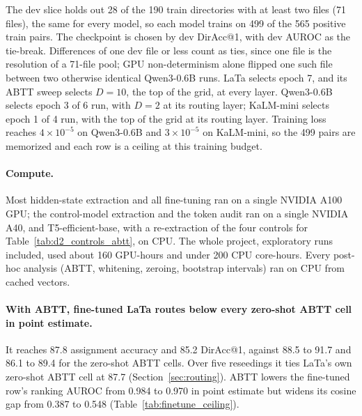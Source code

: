 \documentclass[11pt]{article}
\begin{document}
The dev slice holds out 28 of the 190 train directories with at least two files (71 files), the same for every model, so each model trains on 499 of the 565 positive train pairs.
The checkpoint is chosen by dev DirAcc@1, with dev AUROC as the tie-break.
Differences of one dev file or less count as ties, since one file is the resolution of a 71-file pool; GPU non-determinism alone flipped one such file between two otherwise identical Qwen3-0.6B runs.
LaTa selects epoch 7, and its ABTT sweep selects $D=10$, the top of the grid, at every layer.
Qwen3-0.6B selects epoch 3 of 6 run, with $D=2$ at its routing layer; KaLM-mini selects epoch 1 of 4 run, with the top of the grid at its routing layer.
Training loss reaches $4\times10^{-5}$ on Qwen3-0.6B and $3\times10^{-5}$ on KaLM-mini, so the 499 pairs are memorized and each row is a ceiling at this training budget.

\paragraph{Compute.}
Most hidden-state extraction and all fine-tuning ran on a single NVIDIA A100 GPU; the control-model extraction and the token audit ran on a single NVIDIA A40, and T5-efficient-base, with a re-extraction of the four controls for Table~\ref{tab:d2_controls_abtt}, on CPU.
The whole project, exploratory runs included, used about 160 GPU-hours and under 200 CPU core-hours.
Every post-hoc analysis (ABTT, whitening, zeroing, bootstrap intervals) ran on CPU from cached vectors.

\begingroup
\renewenvironment{table}[1][t]{\begin{table}[#1]}{\end{table}}

\endgroup

\paragraph{With ABTT, fine-tuned LaTa routes below every zero-shot ABTT cell in point estimate.}
It reaches 87.8 assignment accuracy and 85.2 DirAcc@1, against 88.5 to 91.7 and 86.1 to 89.4 for the zero-shot ABTT cells.
Over five reseedings it ties LaTa's own zero-shot ABTT cell at 87.7 (Section~\ref{sec:routing}).
ABTT lowers the fine-tuned row's ranking AUROC from 0.984 to 0.970 in point estimate but widens its cosine gap from 0.387 to 0.548 (Table~\ref{tab:finetune_ceiling}).
\end{document}
